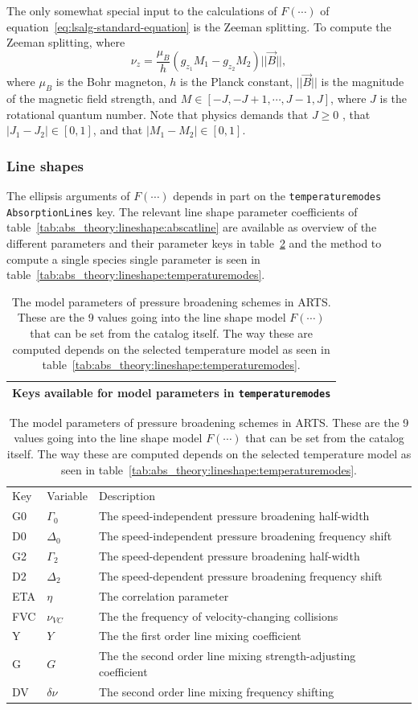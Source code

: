 The only somewhat special input to the calculations of $F(\cdots)$ of equation~\ref{eq:lsalg-standard-equation} is the Zeeman splitting.
To compute the Zeeman splitting, where
\begin{equation}
 \nu_z = \frac{\mu_B}{h}\left(g_{z_1}M_1 - g_{z_2}M_2\right) ||\vec{B}||,
\end{equation}
where
$\mu_B$ is the Bohr magneton,
$h$ is the Planck constant,
$||\vec{B}||$ is the magnitude of the magnetic field strength, and
$M\in\left[-J, -J+1, \cdots, J-1, J\right]$, where $J$ is the rotational quantum number.
Note that physics demands that $J\geq0$ , that $|J_1-J_2|\in[0,1]$, and that $|M_1-M_2|\in[0,1]$.

\subsubsection{Line shapes}

The ellipsis arguments of $F(\cdots)$ depends in part on the \verb|temperaturemodes|
\verb|AbsorptionLines| key.  The relevant line shape parameter coefficients
of table~\ref{tab:abs_theory:lineshape:abscatline} are available as overview
of the different parameters and their parameter keys in table~\ref{tab:abs_theory:lineshape:modelparamaters}
and the method to compute a single species single parameter is seen in table~\ref{tab:abs_theory:lineshape:temperaturemodes}.

\begin{table}[ht!]
 \centering
 \begin{tabular}{c}
  Keys available for model parameters in \verb|temperaturemodes|\\\hline
 \end{tabular}
 \begin{tabular}{lll}
  Key&Variable&Description\\
  G0&$\Gamma_0$&The speed-independent pressure broadening half-width\\
  D0&$\Delta_0$&The speed-independent pressure broadening frequency shift\\
  G2&$\Gamma_2$&The speed-dependent pressure broadening half-width\\
  D2&$\Delta_2$&The speed-dependent pressure broadening frequency shift\\
  ETA&$\eta$&The correlation parameter\\
  FVC&$\nu_{VC}$&The the frequency of velocity-changing collisions\\
  Y&$Y$&The the first order line mixing coefficient\\
  G&$G$&The the second order line mixing strength-adjusting coefficient\\
  DV&$\delta\nu$&The second order line mixing frequency shifting
 \end{tabular}
 \caption{The model parameters of pressure broadening schemes in ARTS.
 These are the 9 values going into the line shape model $F(\cdots)$ that
 can be set from the catalog itself.  The way these are computed
 depends on the selected temperature model as seen in table~\ref{tab:abs_theory:lineshape:temperaturemodes}.}
 \label{tab:abs_theory:lineshape:modelparamaters}
\end{table}

